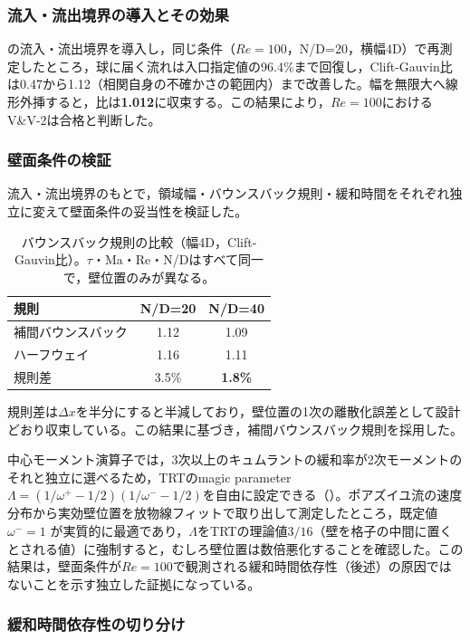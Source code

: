 \subsubsection{流入・流出境界の導入とその効果}

の流入・流出境界を導入し，同じ条件（\(Re=100\)，N/D=20，横幅4D）で再測定したところ，球に届く流れは入口指定値の96.4\%まで回復し，Clift-Gauvin比は0.47から1.12（相関自身の不確かさの範囲内）まで改善した。幅を無限大へ線形外挿すると，比は\textbf{1.012}に収束する。この結果により，\(Re=100\)におけるV\&V-2は合格と判断した。

\subsubsection{壁面条件の検証}

流入・流出境界のもとで，領域幅・バウンスバック規則・緩和時間をそれぞれ独立に変えて壁面条件の妥当性を検証した。

\begin{table}[H]
	\centering
	\caption{バウンスバック規則の比較（幅4D，Clift-Gauvin比）。\(\tau\)・Ma・Re・N/Dはすべて同一で，壁位置のみが異なる。}
	\label{tab:bounceback-rule}
	\begin{tabular}{lcc}
		\Hline{1.5pt}
		規則 & N/D=20 & N/D=40 \\
		\hline
		補間バウンスバック & 1.12 & 1.09 \\
		ハーフウェイ & 1.16 & 1.11 \\
		\hline
		規則差 & 3.5\% & \textbf{1.8\%} \\
	\end{tabular}
\end{table}

規則差は\(\Delta x\)を半分にすると半減しており，壁位置の1次の離散化誤差として設計どおり収束している。この結果に基づき，補間バウンスバック規則を採用した。

中心モーメント演算子では，3次以上のキュムラントの緩和率が2次モーメントのそれと独立に選べるため，TRTのmagic parameter \(\Lambda=(1/\omega^+-1/2)(1/\omega^--1/2)\)を自由に設定できる（）。ポアズイユ流の速度分布から実効壁位置を放物線フィットで取り出して測定したところ，既定値 \(\omega^-=1\) が実質的に最適であり，\(\Lambda\)をTRTの理論値\(3/16\)（壁を格子の中間に置くとされる値）に強制すると，むしろ壁位置は数倍悪化することを確認した。この結果は，壁面条件が\(Re=100\)で観測される緩和時間依存性（後述）の原因ではないことを示す独立した証拠になっている。

\subsubsection{緩和時間依存性の切り分け}

